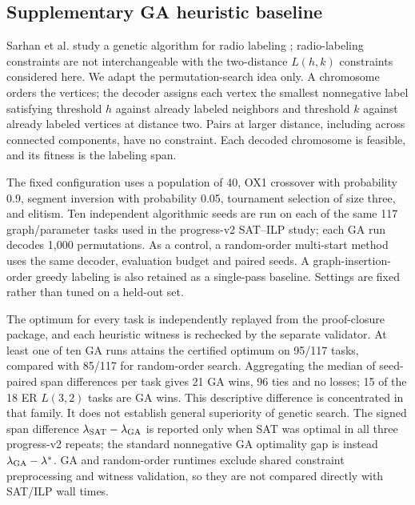 \subsection{Supplementary GA heuristic baseline}
\label{sec:ga-baseline}
Sarhan et al. study a genetic algorithm for radio labeling
\cite{sarhan2026genetic}; radio-labeling constraints are not interchangeable
with the two-distance $L(h,k)$ constraints considered here. We adapt the
permutation-search idea only. A chromosome orders the vertices; the decoder
assigns each vertex the smallest nonnegative label satisfying threshold $h$
against already labeled neighbors and threshold $k$ against already labeled
vertices at distance two. Pairs at larger distance, including across connected
components, have no constraint. Each decoded chromosome is feasible, and its
fitness is the labeling span.

The fixed configuration uses a population of 40, OX1 crossover with
probability 0.9, segment inversion with probability 0.05, tournament
selection of size three, and elitism. Ten independent algorithmic seeds are
run on each of the same 117 graph/parameter tasks used in the progress-v2
SAT--ILP study; each GA run decodes 1,000 permutations. As a control, a
random-order multi-start method uses the same decoder, evaluation budget and
paired seeds. A graph-insertion-order greedy labeling is also retained as a
single-pass baseline. Settings are fixed rather than tuned on a held-out set.

The optimum for every task is independently replayed from the proof-closure
package, and each heuristic witness is rechecked by the separate validator.
At least one of ten GA runs attains the certified optimum on 95/117 tasks,
compared with 85/117 for random-order search. Aggregating the median of
seed-paired span differences per task gives 21 GA wins, 96 ties and no losses;
15 of the 18 ER $L(3,2)$ tasks are GA wins. This descriptive difference is
concentrated in that family. It does not establish general superiority of
genetic search. The signed span difference $\lambda_{\rm SAT}-\lambda_{\rm
GA}$ is reported only when SAT was optimal in all three progress-v2 repeats;
the standard nonnegative GA optimality gap is instead
$\lambda_{\rm GA}-\lambda^*$. GA and random-order runtimes exclude shared
constraint preprocessing and witness validation, so they are not compared
directly with SAT/ILP wall times.

\begin{table}[htbp]
\centering\small
\caption{Fixed-budget GA and random-order outcomes by family and parameter.}
\label{tab:ga-baseline}

\end{table}
